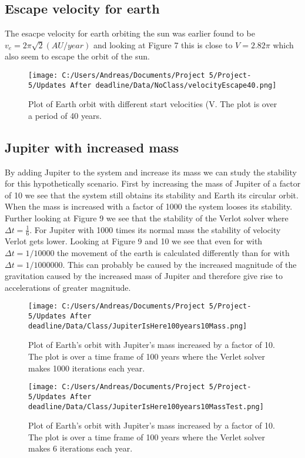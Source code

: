 \documentclass[twoside,twocolumn]{article}
\begin{document}
\subsection{Escape velocity for earth}

The esacpe velocity for earth orbiting the sun was earlier found to be $v_e = 2\pi \sqrt{2} (AU/year)$ and looking at Figure 7 this is close to $V = 2.82\pi$ which also seem to escape the orbit of the sun.
\begin{figure}[H]  \texttt{[image: C:/Users/Andreas/Documents/Project 5/Project-5/Updates After deadline/Data/NoClass/velocityEscape40.png]}
  \caption{Plot of Earth orbit with different start velocities (V. The plot is over a period of 40 years.}
  \label{fig:boat2}
\end{figure}
\subsection{Jupiter with increased mass}
By adding Jupiter to the system and increase its mass we can study the stability for this hypothetically scenario. First by increasing the mass of Jupiter of a factor of 10 we see that the system still obtains its stability and Earth its circular orbit. When the mass is increased with a factor of 1000 the system looses its stability. Further looking at Figure 9 we see that the stability of the Verlot solver where $\Delta t= \frac{1}{6}$. For Jupiter with 1000 times its normal mass the stability of velocity Verlot gets lower. Looking at Figure 9 and 10 we see that even for with$\Delta t = 1/10000$ the movement of the earth is calculated differently than for with $\Delta t = 1/1000000$. This can probably be caused by the increased magnitude of the gravitation caused by the increased mass of Jupiter and therefore give rise to accelerations of greater magnitude.


\begin{figure}[H]  \texttt{[image: C:/Users/Andreas/Documents/Project 5/Project-5/Updates After deadline/Data/Class/JupiterIsHere100years10Mass.png]}
  \caption{Plot of Earth's orbit with Jupiter's mass increased by a factor of 10. The plot is over a time frame of 100 years where the Verlet solver makes 1000 iterations each year.}
  
  \label{fig:boat2}
\end{figure}

\begin{figure}[H]  \texttt{[image: C:/Users/Andreas/Documents/Project 5/Project-5/Updates After deadline/Data/Class/JupiterIsHere100years10MassTest.png]}
  \caption{Plot of Earth's orbit with Jupiter's mass increased by a factor of 10. The plot is over a time frame of 100 years where the Verlet solver makes 6 iterations each year.}
  
  \label{fig:boat2}
\end{figure}
\end{document}
